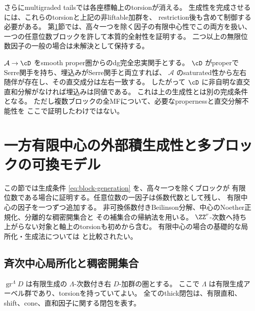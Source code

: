 さらにmultigraded tailsでは各座標軸上のtorsionが消える。
生成性を完成させるには、これらのtorsionと上記の非liftable加群を、
restriction後も含めて制御する必要がある。
第\ref{sec:finite-center}節では、高々一つを除く因子の有限中心性でこの両方を扱い、
一つの任意位数ブロックを許して本質的全射性を証明する。
二つ以上の無限位数因子の一般の場合は未解決として保持する。

\begin{remark}[別の十分条件]
 \(\mathcal A\to\cD\) をsmooth proper圏からのdg完全忠実関手とする。
 \(\cD\) がproperでSerre関手を持ち、埋込みがSerre関手と両立すれば、
 \(\mathcal A\) のsaturated性から左右随伴が存在し、その直交成分は左右一致する。
 したがって \(\cD\) に非自明な直交直和分解がなければ埋込みは同値である。
 これは上の生成性とは別の完成条件となる。
 ただし複数ブロックの全MFについて、必要なpropernessと直交分解不能性を
 ここで証明したわけではない。
\end{remark}

\section{一方有限中心の外部積生成性と多ブロックの可換モデル}\label{sec:finite-center}

この節では生成条件 \eqref{eq:block-generation} を、高々一つを除くブロックが
有限位数である場合に証明する。任意位数の一因子は係数代数として残し、
有限中心の因子を一つずつ追加する。
非可換係数付きBeilinson分解、中心のNoether正規化、分離的な稠密開集合と
その補集合の帰納法を用いる。
\(\ZZ^r\)-次数へ持ち上がらない対象と軸上のtorsionも初めから含む。
有限中心の場合の基礎的な局所化・生成法については \cite{ELS} と比較されたい。

\subsection{斉次中心局所化と稠密開集合}

\(\operatorname{gr}^{\Lambda}D\) は有限生成の \(\Lambda\)-次数付き右 \(D\)-加群の圏とする。
ここで \(\Lambda\) は有限生成アーベル群であり、torsionを持っていてよい。
全てのthick閉包は、有限直和、shift、cone、直和因子に関する閉包を表す。

